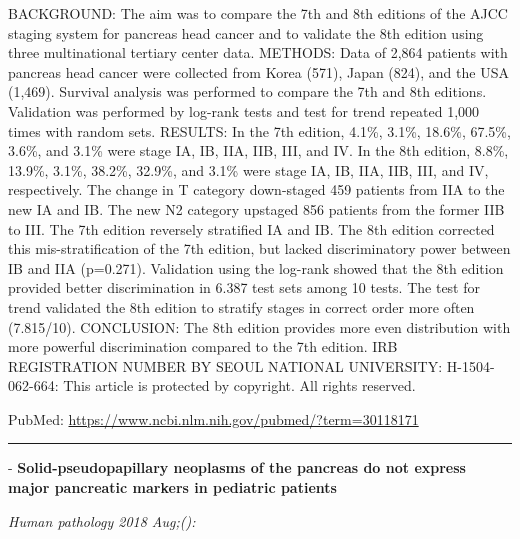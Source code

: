 \documentclass[]{article}
\begin{document}
BACKGROUND: The aim was to compare the 7th and 8th editions of the AJCC
staging system for pancreas head cancer and to validate the 8th edition
using three multinational tertiary center data. METHODS: Data of 2,864
patients with pancreas head cancer were collected from Korea (571),
Japan (824), and the USA (1,469). Survival analysis was performed to
compare the 7th and 8th editions. Validation was performed by log-rank
tests and test for trend repeated 1,000 times with random sets. RESULTS:
In the 7th edition, 4.1\%, 3.1\%, 18.6\%, 67.5\%, 3.6\%, and 3.1\% were
stage IA, IB, IIA, IIB, III, and IV. In the 8th edition, 8.8\%, 13.9\%,
3.1\%, 38.2\%, 32.9\%, and 3.1\% were stage IA, IB, IIA, IIB, III, and
IV, respectively. The change in T category down-staged 459 patients from
IIA to the new IA and IB. The new N2 category upstaged 856 patients from
the former IIB to III. The 7th edition reversely stratified IA and IB.
The 8th edition corrected this mis-stratification of the 7th edition,
but lacked discriminatory power between IB and IIA (p=0.271). Validation
using the log-rank showed that the 8th edition provided better
discrimination in 6.387 test sets among 10 tests. The test for trend
validated the 8th edition to stratify stages in correct order more often
(7.815/10). CONCLUSION: The 8th edition provides more even distribution
with more powerful discrimination compared to the 7th edition. IRB
REGISTRATION NUMBER BY SEOUL NATIONAL UNIVERSITY: H-1504-062-664: This
article is protected by copyright. All rights reserved.

PubMed: \url{https://www.ncbi.nlm.nih.gov/pubmed/?term=30118171}

{}

{}

\begin{center}\rule{0.5\linewidth}{\linethickness}\end{center}

 - \textbf{Solid-pseudopapillary neoplasms of the pancreas do not
express major pancreatic markers in pediatric patients}

\emph{Human pathology 2018 Aug;():}
\end{document}
